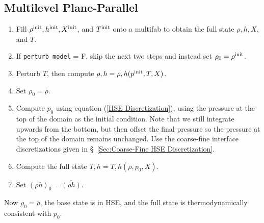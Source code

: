 \subsection{Multilevel Plane-Parallel}
\begin{enumerate}
\item Fill $\rho^{\rm init}, h^{\rm init}, X^{\rm init}$, and $T^{\rm init}$ onto
  a multifab to obtain the full state $\rho, h, X$, and $T$.
\item If {\tt perturb\_model} = F, skip the next two steps and instead
  set $\rho_0 = \rho^{\rm init}$.
\item Perturb $T$, then compute $\rho,h = \rho,h(p^{\rm init},T,X)$.
\item Set $\rho_0 = \overline\rho$.
\item Compute $p_0$ using equation (\ref{HSE Discretization}), using
  the pressure at the top of the domain as the initial condition.
  Note that we still integrate upwards from the bottom, but then
  offset the final pressure so the pressure at the top of the domain
  remains unchanged.  Use the coarse-fine interface discretizations
  given in \S~\ref{Sec:Coarse-Fine HSE Discretization}.
\item Compute the full state $T,h = T,h(\rho,p_0,X)$.
\item Set $(\rho h)_0 = \overline{(\rho h)}$.
\end{enumerate}
Now $\rho_0 = \overline\rho$, the base state is in HSE, and the full
state is thermodynamically consistent with $p_0$.

